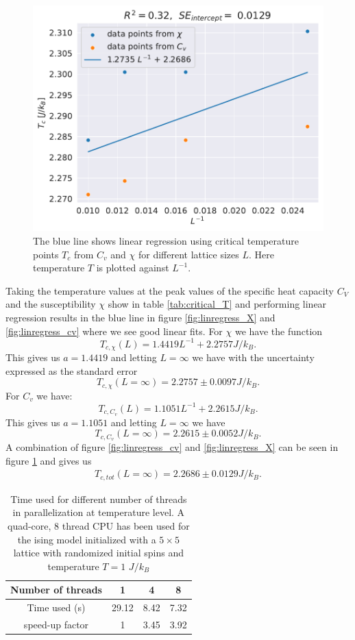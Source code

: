 \documentclass[english,notitlepage,reprint,nofootinbib]{revtex4-1}  %
\begin{document}
\begin{figure}[H]
    \centering
    \includegraphics[width=.5\textwidth]{../figures/linregress.pdf}
    \caption{The blue line shows linear regression using critical temperature points $T_c$ from $C_v$ and $\chi$ for different lattice sizes $L$. Here temperature $T$ is plotted against $L^{-1}$.}
    \label{fig:linregress}
\end{figure}
Taking the temperature values at the peak values of the specific heat capacity $C_V$ and the susceptibility $\chi$ show in table \ref{tab:critical_T} and performing linear regression results in the blue line in figure \ref{fig:linregress_X} and \ref{fig:linregress_cv} where we see good linear fits. For $\chi$ we have the function
\begin{equation}
    T_{c,\chi}(L) = 1.4419 L^{-1} + 2.2757  J/k_B.
\end{equation}
This gives us $a=1.4419$ and letting $L=\infty$ we have with the uncertainty expressed as the standard error
\begin{equation}
    T_{c,\chi}(L=\infty) = 2.2757 \pm 0.0097  J/k_B.
\end{equation}
For $C_v$ we have:
\begin{equation}
    T_{c,C_v}(L) = 1.1051 L^{-1} + 2.2615  J/k_B.
\end{equation}
This gives us $a=1.1051$ and letting $L=\infty$ we have
\begin{equation}
    T_{c,C_v}(L=\infty) = 2.2615 \pm 0.0052  J/k_B.
\end{equation}
A combination of figure \ref{fig:linregress_cv} and \ref{fig:linregress_X} can be seen in figure \ref{fig:linregress} and gives us
\begin{align}
    T_{c,tot}(L=\infty) = 2.2686 \pm 0.0129  J/k_B.
\end{align}
\begin{table}[H]
    \centering
    \caption{Time used for different number of threads in parallelization at temperature level. A quad-core, 8 thread CPU has been used for the ising model initialized with a $5\times5$ lattice with randomized initial spins and temperature $T= 1$ $J/k_B$}
    \label{tab:timing}
    \begin{tabular}{|c|c|c|c|}
        \hline
        Number of threads & 1     & 4    & 8    \\
        \hline
        Time used (s)     & 29.12 & 8.42 & 7.32 \\
        \hline
        speed-up factor   & 1     & 3.45 & 3.92 \\
        \hline
    \end{tabular}
\end{table}
\end{document}
